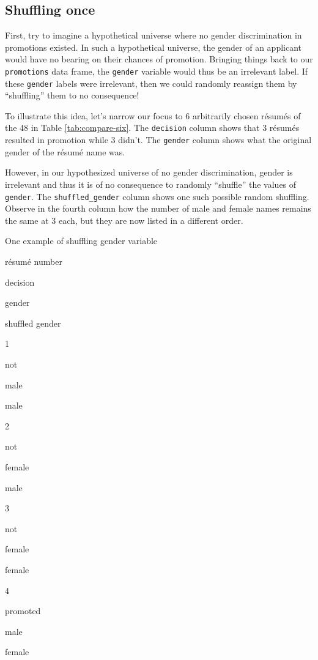 \documentclass[
]{book}
\begin{document}
\hypertarget{shuffling-once}{%
\subsection{Shuffling once}\label{shuffling-once}}

First, try to imagine a hypothetical universe where no gender discrimination in promotions existed. In such a hypothetical universe, the gender of an applicant would have no bearing on their chances of promotion. Bringing things back to our \texttt{promotions} data frame, the \texttt{gender} variable would thus be an irrelevant label. If these \texttt{gender} labels were irrelevant, then we could randomly reassign them by ``shuffling'' them to no consequence!

To illustrate this idea, let's narrow our focus to 6 arbitrarily chosen résumés of the 48 in Table \ref{tab:compare-six}. The \texttt{decision} column shows that 3 résumés resulted in promotion while 3 didn't. The \texttt{gender} column shows what the original gender of the résumé name was.

However, in our hypothesized universe of no gender discrimination, gender is irrelevant and thus it is of no consequence to randomly ``shuffle'' the values of \texttt{gender}. The \texttt{shuffled\_gender} column shows one such possible random shuffling. Observe in the fourth column how the number of male and female names remains the same at 3 each, but they are now listed in a different order.

\label{tab:compare-six}One example of shuffling gender variable

résumé number

decision

gender

shuffled gender

1

not

male

male

2

not

female

male

3

not

female

female

4

promoted

male

female
\end{document}
